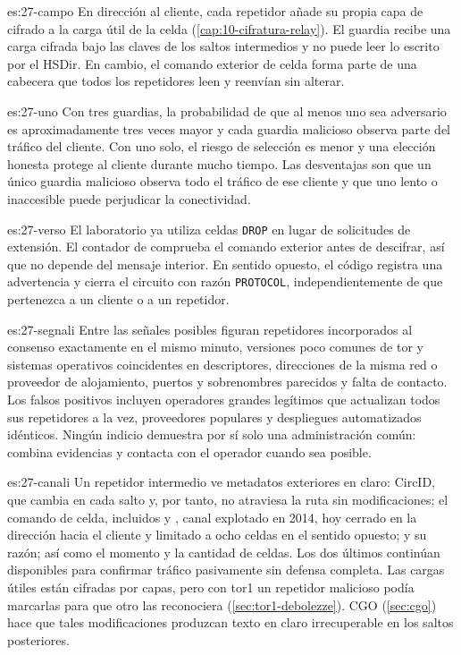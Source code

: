 \begin{soluzione}{es:27-campo}
En dirección al cliente, cada repetidor añade su propia capa de cifrado a la carga útil de la celda (\cref{cap:10-cifratura-relay}). El guardia recibe una carga cifrada bajo las claves de los saltos intermedios y no puede leer lo escrito por el HSDir. En cambio, el comando exterior de celda forma parte de una cabecera que todos los repetidores leen y reenvían sin alterar.
\end{soluzione}

\begin{soluzione}{es:27-uno}
Con tres guardias, la probabilidad de que al menos uno sea adversario es aproximadamente tres veces mayor y cada guardia malicioso observa parte del tráfico del cliente. Con uno solo, el riesgo de selección es menor y una elección honesta protege al cliente durante mucho tiempo. Las desventajas son que un único guardia malicioso observa todo el tráfico de ese cliente y que uno lento o inaccesible puede perjudicar la conectividad.
\end{soluzione}

\begin{soluzione}{es:27-verso}
El laboratorio ya utiliza celdas \texttt{DROP} en lugar de solicitudes de extensión. El contador de  comprueba el comando exterior antes de descifrar, así que no depende del mensaje interior. En sentido opuesto, el código registra una advertencia y cierra el circuito con razón \texttt{PROTOCOL}, independientemente de que pertenezca a un cliente o a un repetidor.
\end{soluzione}

\begin{soluzione}{es:27-segnali}
Entre las señales posibles figuran repetidores incorporados al consenso exactamente en el mismo minuto, versiones poco comunes de tor y sistemas operativos coincidentes en descriptores, direcciones de la misma red o proveedor de alojamiento, puertos y sobrenombres parecidos y falta de contacto. Los falsos positivos incluyen operadores grandes legítimos que actualizan todos sus repetidores a la vez, proveedores populares y despliegues automatizados idénticos. Ningún indicio demuestra por sí solo una administración común: combina evidencias y contacta con el operador cuando sea posible.
\end{soluzione}

\begin{soluzione}{es:27-canali}
Un repetidor intermedio ve metadatos exteriores en claro: CircID, que cambia en cada salto y, por tanto, no atraviesa la ruta sin modificaciones; el comando de celda, incluidos  y , canal explotado en 2014, hoy cerrado en la dirección hacia el cliente y limitado a ocho celdas en el sentido opuesto;  y su razón; así como el momento y la cantidad de celdas. Los dos últimos continúan disponibles para confirmar tráfico pasivamente sin defensa completa. Las cargas útiles están cifradas por capas, pero con tor1 un repetidor malicioso podía marcarlas para que otro las reconociera (\cref{sec:tor1-debolezze}). CGO (\cref{sec:cgo}) hace que tales modificaciones produzcan texto en claro irrecuperable en los saltos posteriores.
\end{soluzione}
